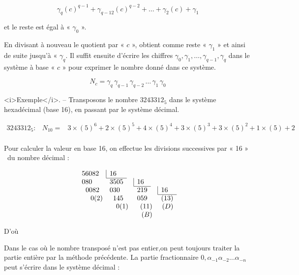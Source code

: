 \[
      \gamma_q(c)^{q-1} +   \gamma_{q-12} (c)^{q-2} + \ldots + \gamma_2 (c) + \gamma_1 
 \]

et le reste est égal à « $\gamma_0$ ».

En divisant à nouveau le quotient par « $c$ », obtient comme reste « $\gamma_1$ » et ainsi de suite jusqu'à  « $\gamma_q$. Il suffit ensuite d'écrire les chiffres $\gamma_0, \gamma_1,\ldots, \gamma_{q-1},\gamma_q$ dans le système à base « $c$ » pour exprimer le nombre donné dans ce système. 

\[ N_c =  \gamma_q\, \gamma_{q-1}\,  \gamma_{q-2}\,\ldots\,\gamma_1 \, \gamma_0 \]  



<i>Exemple</i>. -- Transposons le nombre $3243312_{5}$ dans le système hexadécimal (base
16), en passant par le système décimal.


\[ \begin{array}{rcl}
3243312_{5} :  & N_{10} = & 3\times(5)^{6}+2\times(5)^{5}+4\times(5)^{4}+3\times(5)^{3}+3\times(5)^{2}+1\times(5)+2\\
\end{array} \]


 \centerline {}
 
 \bigskip 
 
Pour calculer la valeur en base 16, on effectue les divisions successives
par « 16 » ~du nombre décimal :


\[ 
\begin{array}{lrcrcr}
56082  & \multicolumn{1}{|l}{16} \\
 \cline{2-2} 
080  & 3505  && \multicolumn{1}{|l}{16} \\
\cline {4-4} 
\;\;0082  & \multicolumn{1}{l}{030} & & 219  & & \multicolumn{1}{|l}{16}\\
\cline {6-6} 
\quad \; 0(2)  & 145  &&  059  &&  (13) \\
\multicolumn{3}{r}{0(1){\;}} & \multicolumn{2}{r}{(11){\;}}   & (D) \\
 & &  & \multicolumn{2}{r}{(B){\;}}   \\
\end{array} 
\]


D'où

\centerline { }

\bigskip 

Dans le cas où le nombre transposé n'est pas entier,on peut toujours traiter la partie entière par la méthode précédente.
La partie fractionnaire $0, \alpha_{-1} \alpha_{-2} \ldots\alpha_{-n}$ peut s'écrire dans le système décimal :


